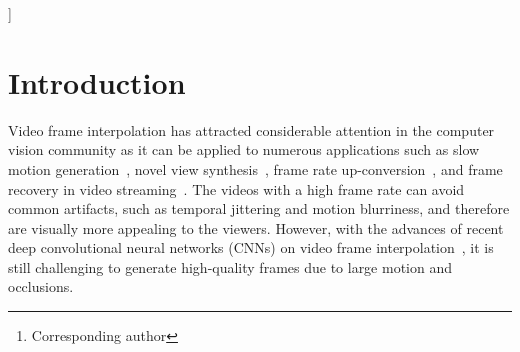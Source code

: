 \documentclass[10pt,twocolumn,letterpaper]{article}
\renewcommand{\thefootnote}{\fnsymbol{footnote}}
\begin{document}
{\begin{center}
\begin{minipage}{1\linewidth}
\begin{tabular}{lrlrlrlrlr}
			\end{tabular} 
\end{minipage}
			\vspace{-5pt}
\label{fig:preface} \end{center}
}]

 \thispagestyle{empty}
	
	
	\begin{abstract}
Video frame interpolation aims to synthesize non-existent frames in-between the original frames.
While significant advances have been made from the recent deep convolutional neural networks, the quality of interpolation is often reduced due to large object motion or occlusion.
In this work, we propose a video frame interpolation method which explicitly detects the occlusion by exploring the depth information.
Specifically, we develop a depth-aware flow projection layer to synthesize intermediate flows that preferably sample closer objects than farther ones.
In addition, we learn hierarchical features to gather contextual information from neighboring pixels.
The proposed model then warps the input frames, depth maps, and contextual features based on the optical flow and local interpolation kernels for synthesizing the output frame.
Our model is compact, efficient, and fully differentiable.
Quantitative and qualitative results demonstrate that the proposed model performs favorably against state-of-the-art frame interpolation methods on a wide variety of datasets.
The source code and pre-trained model are available at \url{https://github.com/baowenbo/DAIN}.{\let\thefootnote\relax\footnote{Corresponding author}}


	\end{abstract}
	
	\section{Introduction}
Video frame interpolation has attracted considerable attention in the computer vision community as it can be applied to numerous applications such as slow motion generation~\cite{jiang2017super}, novel view synthesis~\cite{flynn2016deepstereo}, frame rate up-conversion~\cite{bao2018high, castagno1996method}, and frame recovery in video streaming~\cite{wu2016modeling}.
The videos with a high frame rate can avoid common artifacts, such as temporal jittering and motion blurriness, and therefore are visually more appealing to the viewers.
However, with the advances of recent deep convolutional neural networks (CNNs) on video frame interpolation~\cite{jiang2017super, liu2017video, niklaus2018context, niklaus2017videoSepConv, xue2017video}, it is still challenging to generate high-quality frames due to large motion and occlusions.
	
\end{document}
